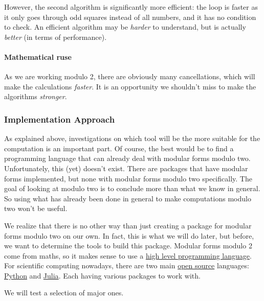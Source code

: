 However, the second algorithm is significantly more efficient: the loop is faster as it only goes through odd squares instead of all numbers, and it has no condition to check.
An efficient algorithm may be \textit{harder} to understand, but is actually \textit{better} (in terms of performance).

\paragraph{Mathematical ruse}
As we are working modulo 2, there are obviously many cancellations, which will make the calculations \textit{faster}.
It is an opportunity we shouldn't miss to make the algorithms \textit{stronger}.



\subsubsection{Implementation Approach}
As explained above, investigations on which tool will be the more suitable for the computation is an important part.
Of course, the best would be to find a programming language that can already deal with modular forms modulo two.
Unfortunately, this (yet) doesn't exist.
There are packages that have modular forms implemented, but none with modular forms modulo two specifically.
The goal of looking at modulo two is to conclude more than what we know in general.
So using what has already been done in general to make computations modulo two won't be useful.

We realize that there is no other way than just creating a package for modular forms modulo two on our own.
In fact, this is what we will do later, but before, we want to determine the tools to build this package.
Modular forms modulo 2 come from maths, so it makes sense to use a \href{https://en.wikipedia.org/wiki/High-level_programming_language}{high level programming language}.
For scientific computing nowadays, there are two main \href{https://en.wikipedia.org/wiki/Open-source_model}{open source} languages: \href{https://en.wikipedia.org/wiki/Python_(programming_language)}{Python} and \href{https://en.wikipedia.org/wiki/Julia_(programming_language)}{Julia}.
Each having various packages to work with.

We will test a selection of major ones.



